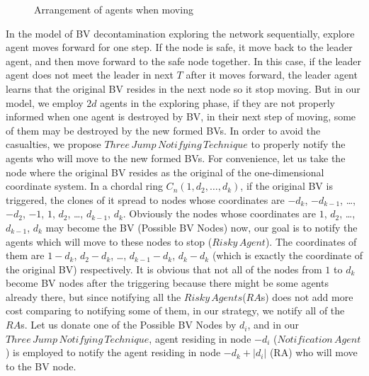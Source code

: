 \begin{figure} [H]
  \centering 
  \hspace{1in} 
  \caption{Arrangement of agents when moving} 
  \label{fig:subfig1} %
\end{figure}

In the model of BV decontamination exploring the network sequentially, explore agent moves forward for one step. If the node is safe, it move back to the leader agent, and then move forward to the safe node together. In this case, if the leader agent does not meet the leader in next $T$ after it moves forward, the leader agent learns that the original BV resides in the next node so it stop moving. 
But in our model, we employ $2d$ agents in the exploring phase, if they are not properly informed when one agent is destroyed by BV, in their next step of moving, some of them may be destroyed by the new formed BVs. In order to avoid the casualties, we propose $Three\,Jump\,Notifying\,Technique$ to properly notify the agents who will move to the new formed BVs.
For convenience, let us take the node where the original BV resides as the original of the one-dimensional coordinate system. In a chordal ring $C_n(1, d_2, \ldots,  d_k)$, if the original BV is triggered, the clones of it spread to nodes whose coordinates are $-d_k$, $-d_{k-1}$, \ldots, $-d_2$, $-1$, $1$, $d_2$, \ldots, $d_{k-1}$, $d_k$. Obviously the nodes whose coordinates are $1$, $d_2$, \dots, $d_{k-1}$, $d_k$ may become the BV (Possible BV Nodes) now, our goal is to notify the agents which will move to these nodes to stop ($Risky\,Agent$). The coordinates of them are $1- d_k$, $d_2-d_k$, \ldots, $d_{k-1}-d_k$, $d_k-d_k$ (which is exactly the coordinate of the original BV) respectively. It is obvious that not all of the nodes from $1$ to $d_k$ become BV nodes after the triggering because there might be some agents already there, but since notifying all the $Risky\,Agents$($RA$s) does not add more cost comparing to notifying some of them, in our strategy, we notify all of the $RA$s. Let us donate one of the Possible BV Nodes by $d_i$, and in our $Three\,Jump\,Notifying\,Technique$, agent residing in node $-d_i$ ($Notification\,Agent$) is employed to notify the agent residing in node $-d_k+\left |d_i\right |$ (RA) who will move to the BV node. 

